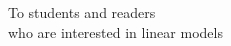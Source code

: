 \cleardoublepage
\thispagestyle{empty}
\begin{center}
\Large\itshape


To students and readers\\
who are interested in linear models

 
\end{center}
